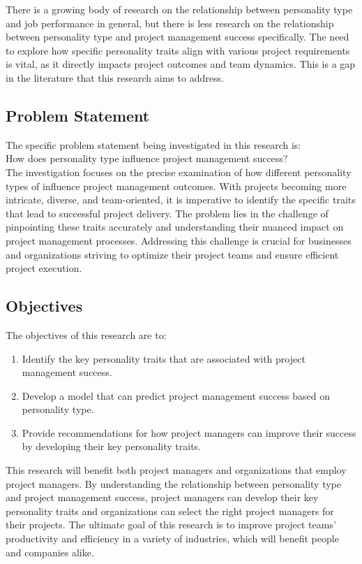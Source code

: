 \documentclass[a4Paper]{article}
\begin{document}
There is a growing body of research on the relationship between personality type and job performance in general, but there is less research on the relationship between personality type and project management success specifically. The need to explore how specific personality traits align with various project requirements is vital, as it directly impacts project outcomes and team dynamics. This is a gap in the literature that this research aims to address.

\subsection{Problem Statement}
The specific problem statement being investigated in this research is:\\

How does personality type influence project management success?\\

The investigation focuses on the precise examination of how different personality types of influence project management outcomes. With projects becoming more intricate, diverse, and team-oriented, it is imperative to identify the specific traits that lead to successful project delivery. The problem lies in the challenge of pinpointing these traits accurately and understanding their nuanced impact on project management processes. Addressing this challenge is crucial for businesses and organizations striving to optimize their project teams and ensure efficient project execution.

\subsection{Objectives}
The objectives of this research are to:
\begin{enumerate}
    \item Identify the key personality traits that are associated with project management success.
    \item Develop a model that can predict project management success based on personality type.
    \item Provide recommendations for how project managers can improve their success by developing their key personality traits.
\end{enumerate}
This research will benefit both project managers and organizations that employ project managers. By understanding the relationship between personality type and project management success, project managers can develop their key personality traits and organizations can select the right project managers for their projects. The ultimate goal of this research is to improve project teams' productivity and efficiency in a variety of industries, which will benefit people and companies alike.
\end{document}
